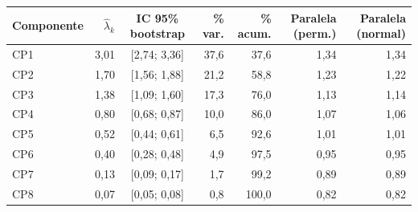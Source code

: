 \begin{tabular}{lrcrrrr}
\toprule
Componente & $\hat\lambda_k$ & IC 95\% bootstrap & \% var. & \% acum. & Paralela (perm.) & Paralela (normal) \\
\midrule
CP1 & 3,01 & [2,74; 3,36] & 37,6 & 37,6 & 1,34 & 1,34 \\
CP2 & 1,70 & [1,56; 1,88] & 21,2 & 58,8 & 1,23 & 1,22 \\
CP3 & 1,38 & [1,09; 1,60] & 17,3 & 76,0 & 1,13 & 1,14 \\
CP4 & 0,80 & [0,68; 0,87] & 10,0 & 86,0 & 1,07 & 1,06 \\
CP5 & 0,52 & [0,44; 0,61] & 6,5 & 92,6 & 1,01 & 1,01 \\
CP6 & 0,40 & [0,28; 0,48] & 4,9 & 97,5 & 0,95 & 0,95 \\
CP7 & 0,13 & [0,09; 0,17] & 1,7 & 99,2 & 0,89 & 0,89 \\
CP8 & 0,07 & [0,05; 0,08] & 0,8 & 100,0 & 0,82 & 0,82 \\
\bottomrule
\end{tabular}
